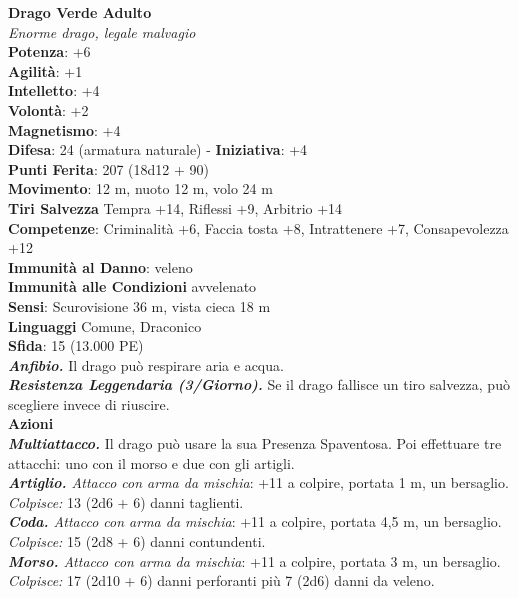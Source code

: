 \begin{multicols}{2}
\medskip\textbf{Drago Verde Adulto}\\
\emph{Enorme drago, legale malvagio}\\
\textbf{Potenza}: +6\\
\textbf{Agilità}: +1\\
\textbf{Intelletto}: +4\\
\textbf{Volontà}: +2\\
\textbf{Magnetismo}: +4\\
\textbf{Difesa}: 24 (armatura naturale) - \textbf{Iniziativa}: +4\\
\textbf{Punti Ferita}: 207 (18d12 + 90)\\
\textbf{Movimento}: 12 m, nuoto 12 m, volo 24 m\\
\textbf{Tiri Salvezza} Tempra +14, Riflessi +9, Arbitrio +14\\
\textbf{Competenze}: Criminalità +6, Faccia tosta +8, Intrattenere +7, Consapevolezza +12\\
\textbf{Immunità al Danno}: veleno\\
\textbf{Immunità alle Condizioni} avvelenato\\
\textbf{Sensi}: Scurovisione 36 m, vista cieca 18 m\\
\textbf{Linguaggi} Comune, Draconico\\
\textbf{Sfida}: 15 (13.000 PE)\smallskip\\
\emph{\textbf{Anfibio.}} Il drago può respirare aria e acqua.\\
\emph{\textbf{Resistenza Leggendaria (3/Giorno).}} Se il drago fallisce un tiro salvezza, può scegliere invece di riuscire.\\
\smallskip\textbf{Azioni}\\
\emph{\textbf{Multiattacco.}} Il drago può usare la sua Presenza Spaventosa. Poi effettuare tre attacchi: uno con il morso e due con gli artigli.\\
\emph{\textbf{Artiglio.} Attacco con arma da mischia}: +11 a colpire, portata 1 m, un bersaglio.\\
\emph{Colpisce:} 13 (2d6 + 6) danni taglienti.\\
\emph{\textbf{Coda.} Attacco con arma da mischia}: +11 a colpire, portata 4,5 m, un bersaglio.\\
\emph{Colpisce:} 15 (2d8 + 6) danni contundenti. \\
\emph{\textbf{Morso.} Attacco con arma da mischia}: +11 a colpire, portata 3 m, un bersaglio.\\
\emph{Colpisce:} 17 (2d10 + 6) danni perforanti più 7 (2d6) danni da veleno.\\

\end{multicols}
